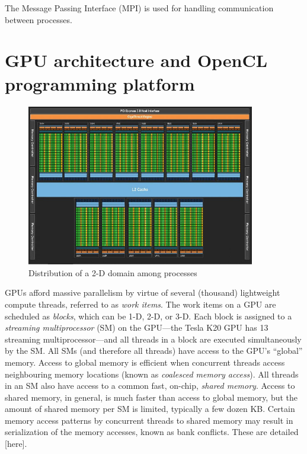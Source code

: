 \documentclass{article}
\begin{document}
    The Message Passing Interface (MPI) is used for handling communication
    between processes.

\section{GPU architecture and OpenCL programming platform}

    \begin{figure}[h]
    \begin{center}
    \includegraphics[height=200pt]{img/tesla-block-diagram.jpg}
    \end{center}
    \caption{Distribution of a 2-D domain among processes}
    \label{fig:da-domain}
    \end{figure}

    GPUs afford massive parallelism by virtue of several (thousand)
    lightweight compute threads, referred to as \emph{work items}.
    The work items on a GPU are scheduled as \emph{blocks},
    which can be 1-D, 2-D, or 3-D.
    Each block is assigned to a \emph{streaming multiprocessor} (SM)
    on the GPU---the Tesla K20 GPU has 13 streaming multiprocessor---and
    all threads in a block are executed simultaneously by the SM.
    All SMs (and therefore all threads) have access to the GPU's ``global'' memory.
    Access to global memory is efficient when concurrent threads
    access neighbouring memory locations
    (known as \emph{coalesced memory access}).
    All threads in an SM also have access to a common fast, on-chip, \emph{shared memory}.
    Access to shared memory, in general, is much faster than access to global memory,
    but the amount of shared memory per SM is limited, typically a few dozen KB.
    Certain memory access patterns by concurrent threads to shared memory may result in
    serialization of the memory accesses, known as bank conflicts. These are detailed [here].
\end{document}
